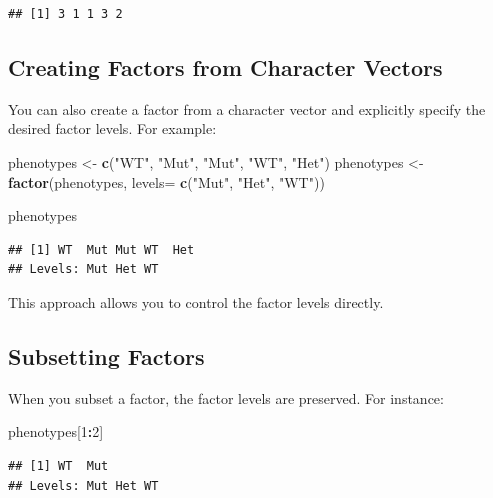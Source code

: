 \documentclass[
]{book}
\newenvironment{Shaded}{\begin{snugshade}}{\end{snugshade}}
\newcommand{\AttributeTok}[1]{\textcolor[rgb]{0.13,0.29,0.53}{#1}}
\newcommand{\DecValTok}[1]{\textcolor[rgb]{0.00,0.00,0.81}{#1}}
\newcommand{\FunctionTok}[1]{\textcolor[rgb]{0.13,0.29,0.53}{\textbf{#1}}}
\newcommand{\NormalTok}[1]{#1}
\newcommand{\OtherTok}[1]{\textcolor[rgb]{0.56,0.35,0.01}{#1}}
\newcommand{\SpecialCharTok}[1]{\textcolor[rgb]{0.81,0.36,0.00}{\textbf{#1}}}
\newcommand{\StringTok}[1]{\textcolor[rgb]{0.31,0.60,0.02}{#1}}
\begin{document}
\begin{verbatim}
## [1] 3 1 1 3 2
\end{verbatim}

\hypertarget{creating-factors-from-character-vectors}{%
\subsection{Creating Factors from Character Vectors}\label{creating-factors-from-character-vectors}}

You can also create a factor from a character vector and explicitly specify the desired factor levels. For example:

\begin{Shaded}
\begin{Highlighting}[]
\NormalTok{phenotypes }\OtherTok{\textless{}{-}} \FunctionTok{c}\NormalTok{(}\StringTok{"WT"}\NormalTok{, }\StringTok{"Mut"}\NormalTok{, }\StringTok{"Mut"}\NormalTok{, }\StringTok{"WT"}\NormalTok{, }\StringTok{"Het"}\NormalTok{)}
\NormalTok{phenotypes }\OtherTok{\textless{}{-}} \FunctionTok{factor}\NormalTok{(phenotypes, }\AttributeTok{levels=} \FunctionTok{c}\NormalTok{(}\StringTok{"Mut"}\NormalTok{, }\StringTok{"Het"}\NormalTok{, }\StringTok{"WT"}\NormalTok{))}

\NormalTok{phenotypes}
\end{Highlighting}
\end{Shaded}

\begin{verbatim}
## [1] WT  Mut Mut WT  Het
## Levels: Mut Het WT
\end{verbatim}

This approach allows you to control the factor levels directly.

\hypertarget{subsetting-factors}{%
\subsection{Subsetting Factors}\label{subsetting-factors}}

When you subset a factor, the factor levels are preserved. For instance:

\begin{Shaded}
\begin{Highlighting}[]
\NormalTok{phenotypes[}\DecValTok{1}\SpecialCharTok{:}\DecValTok{2}\NormalTok{]}
\end{Highlighting}
\end{Shaded}

\begin{verbatim}
## [1] WT  Mut
## Levels: Mut Het WT
\end{verbatim}
\end{document}
